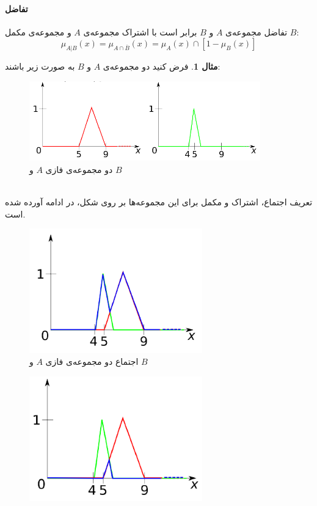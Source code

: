 \documentclass[12pt,a4paper]{article}
\theoremstyle{definition}
\newtheorem{exmp}{مثال}[section]
\begin{document}
 \paragraph{تفاضل}
 تفاضل مجموعه‌ی $A$ و $B$ برابر است با اشتراک مجموعه‌ی $A$ و مجموعه‌ی مکمل $B$:
 \begin{equation}\label{eq:e_fset_op_difference}
 \mu_{A|B}(x) = \mu_{A \cap \overline{B}}(x) = \mu_{A}(x) \cap [ 1 - \mu_{B}(x)]
 \end{equation}
\begin{exmp}
	فرض کنید دو مجموعه‌ی $A$ و $B$ به صورت زیر باشند:
\begin{figure}[h]
	\centering 
	\includegraphics[width=100mm]{Images/Fig8.png}
	\vspace{-0.5cm}
	\caption{دو مجموعه‌ی فازی $ A $ و $ B $} \label{fig:f_fset_op_exmp}
\end{figure}\\
تعریف اجتماع، اشتراک و مکمل برای این مجموعه‌ها بر روی شکل، در ادامه آورده شده است. 
\begin{figure}[h]
	\centering 
	\includegraphics[width=75mm]{Images/Fig9.png}
	\vspace{-0.5cm}
	\caption{اجتماع دو مجموعه‌ی فازی $ A $ و $ B $} \label{fig:f_fset_op_exmp_union}
\end{figure}
\begin{figure}[h]
	\centering 
	\includegraphics[width=75mm]{Images/Fig10.png}

\end{figure}
\end{exmp}
\end{document}
